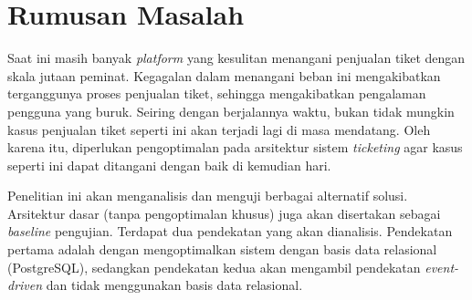 \section{Rumusan Masalah}

Saat ini masih banyak \textit{platform} yang kesulitan menangani penjualan tiket dengan skala jutaan peminat. Kegagalan dalam menangani beban ini mengakibatkan terganggunya proses penjualan tiket, sehingga mengakibatkan pengalaman pengguna yang buruk. Seiring dengan berjalannya waktu, bukan tidak mungkin kasus penjualan tiket seperti ini akan terjadi lagi di masa mendatang. Oleh karena itu, diperlukan pengoptimalan pada arsitektur sistem \textit{ticketing} agar kasus seperti ini dapat ditangani dengan baik di kemudian hari.

Penelitian ini akan menganalisis dan menguji berbagai alternatif solusi. Arsitektur dasar (tanpa pengoptimalan khusus) juga akan disertakan sebagai \textit{baseline} pengujian. Terdapat dua pendekatan yang akan dianalisis. Pendekatan pertama adalah dengan mengoptimalkan sistem dengan basis data relasional (PostgreSQL), sedangkan pendekatan kedua akan mengambil pendekatan \textit{event-driven} dan tidak menggunakan basis data relasional.